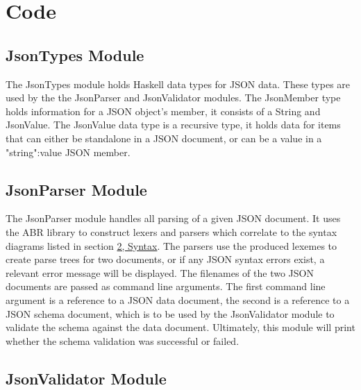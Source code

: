 \documentclass[a4paper]{article}
\begin{document}
\newpage

\section{Code}

\subsection{JsonTypes Module}

The JsonTypes module holds Haskell data types for JSON data. These types are
used by the the JsonParser and JsonValidator modules. The JsonMember type
holds information for a JSON object's member, it consists of a String and JsonValue.
The JsonValue data type is a recursive type, it holds data for items that 
can either be standalone in a JSON document, or can be a value in a "string":value
JSON member.

\newpage

\subsection{JsonParser Module}

The JsonParser module handles all parsing of a given JSON document. It uses the ABR library
to construct lexers and parsers which correlate to the syntax diagrams listed in section
\hyperref[sec:syntax]{2, Syntax}. The parsers use the produced lexemes to create parse trees for two documents, or
if any JSON syntax errors exist, a relevant error message will be displayed.
The filenames of the two JSON documents are passed as command line arguments. The first command line argument is a reference to 
a JSON data document, the second is a reference to a JSON schema document, which is to
be used by the JsonValidator module to validate the schema against the data document.
Ultimately, this module will print whether the schema validation was successful or failed.


\newpage

\subsection{JsonValidator Module}
\end{document}
